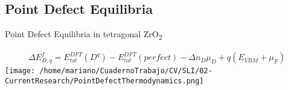 \subsection{Point Defect Equilibria}
\begin{frame}{Point Defect Equilibria in tetragonal ZrO\textsubscript{2} }
\begin{center}
\begin{align*}
\Delta E_{D,q} ^f = E_{tot}^{DFT} (D^q) - E_{tot} ^{DFT} (perfect) - \Delta n_D \mu_D + q( E_{VBM} + \mu _F ) 
\end{align*}
\texttt{[image: /home/mariano/CuadernoTrabajo/CV/SLI/02-CurrentResearch/PointDefectThermodynamics.png]}
\end{center}



\end{frame}
